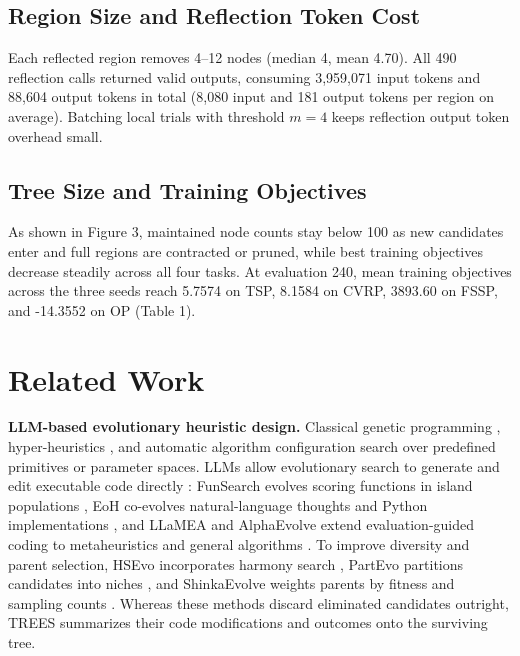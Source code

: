 \documentclass{article}
\begin{document}
\subsection{Region Size and Reflection Token Cost}\label{region-size-and-reflection-token-cost}

Each reflected region removes 4--12 nodes (median 4, mean 4.70). All 490 reflection calls returned valid outputs, consuming 3,959,071 input tokens and 88,604 output tokens in total (8,080 input and 181 output tokens per region on average). Batching local trials with threshold \(m=4\) keeps reflection output token overhead small.

\subsection{Tree Size and Training Objectives}\label{tree-size-and-training-objectives}

As shown in Figure 3, maintained node counts stay below 100 as new candidates enter and full regions are contracted or pruned, while best training objectives decrease steadily across all four tasks. At evaluation 240, mean training objectives across the three seeds reach 5.7574 on TSP, 8.1584 on CVRP, 3893.60 on FSSP, and -14.3552 on OP (Table 1).

\section{Related Work}\label{related-work}

\textbf{LLM-based evolutionary heuristic design.} Classical genetic programming \citep{koza}, hyper-heuristics \citep{hh}, and automatic algorithm configuration \citep{irace} search over predefined primitives or parameter spaces. LLMs allow evolutionary search to generate and edit executable code directly \citep{elm, lmcrossover, survey_aad}: FunSearch evolves scoring functions in island populations \citep{funsearch}, EoH co-evolves natural-language thoughts and Python implementations \citep{eoh}, and LLaMEA and AlphaEvolve extend evaluation-guided coding to metaheuristics and general algorithms \citep{llamea, alphaevolve}. To improve diversity and parent selection, HSEvo incorporates harmony search \citep{hsevo}, PartEvo partitions candidates into niches \citep{partevo}, and ShinkaEvolve weights parents by fitness and sampling counts \citep{shinka}. Whereas these methods discard eliminated candidates outright, TREES summarizes their code modifications and outcomes onto the surviving tree.
\end{document}
